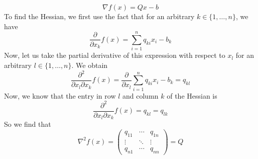 \documentclass[12pt]{article}
\begin{document}
\[
\nabla f(x) = Qx - b
\] To find the Hessian, we first use the fact that for an arbitrary $k \in \{1,\ldots,n\}$, we have
\[
\frac{\partial}{\partial x_k} f(x) =  \sum_{i=1}^n q_{ki} x_i - b_k
\] Now, let us take the partial derivative of this expression with respect to $x_l$ for an arbitrary $l \in \{1,\ldots,n\}$. We obtain
\[
\frac{\partial^2}{\partial x_l \partial x_k} f(x) = \frac{\partial}{\partial x_l} \sum_{i=1}^n q_{ki} x_i - b_k = q_{kl}
\] Now, we know that the entry in row $l$ and column $k$ of the Hessian is 
\[
\frac{\partial^2}{\partial x_l \partial x_k} f(x) = q_{kl} = q_{lk} 
\] So we find that 
\[
\nabla^2 f(x) = \begin{pmatrix}
q_{11} & \cdots & q_{1n}\\
\vdots & \ddots & \vdots\\
q_{n1} & \cdots & q_{nn}
\end{pmatrix} = Q
\]
\newpage
\end{document}
